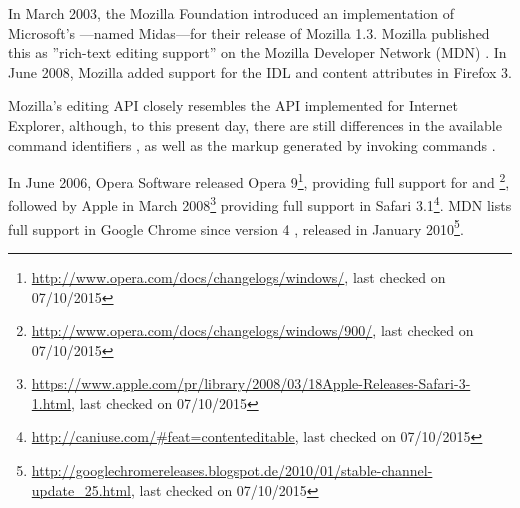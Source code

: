 In March 2003, the Mozilla Foundation introduced an implementation of Microsoft's ---named Midas---for their release of Mozilla 1.3. Mozilla published this as ''rich-text editing support'' on the Mozilla Developer Network (MDN) \cite{ak}. In June 2008, Mozilla added support for the  IDL and  content attributes in Firefox 3. 


Mozilla's editing API closely resembles the API implemented for Internet Explorer, although, to this present day, there are still differences in the available command identifiers \cite{am,ad}, as well as the markup generated by invoking commands \cite{ak}. 




In June 2006, Opera Software released Opera 9\footnote{\url{http://www.opera.com/docs/changelogs/windows/}, last checked on 07/10/2015}, providing full support for  and \footnote{\url{http://www.opera.com/docs/changelogs/windows/900/}, last checked on 07/10/2015}, followed by Apple in March 2008\footnote{\url{https://www.apple.com/pr/library/2008/03/18Apple-Releases-Safari-3-1.html}, last checked on 07/10/2015} providing full support in Safari 3.1\footnote{\url{http://caniuse.com/\#feat=contenteditable}, last checked on 07/10/2015}. MDN lists full support in Google Chrome since version 4 \cite{as}, released in January 2010\footnote{\url{http://googlechromereleases.blogspot.de/2010/01/stable-channel-update\_25.html}, last checked on 07/10/2015}.

